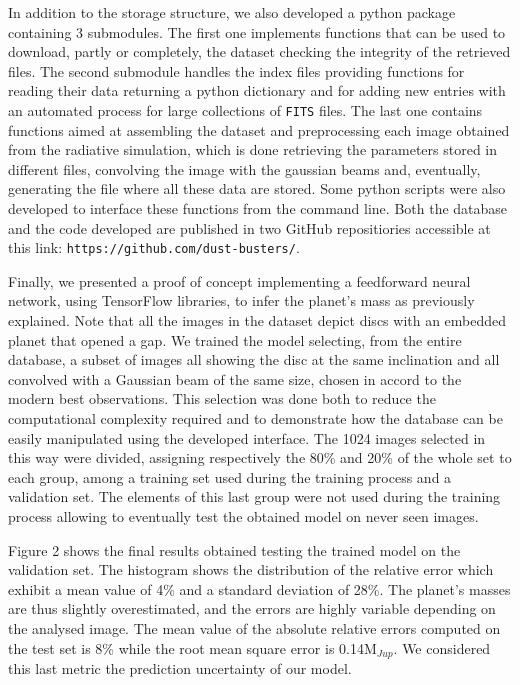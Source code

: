 \documentclass[a4paper,10pt, margin=1cm]{article}
\begin{document}
In addition to the storage structure, we also developed a python package containing 3 submodules. 
The first one implements functions that can be used to download, partly or completely, the dataset
checking the integrity of the retrieved files.
The second submodule handles the index files providing functions for reading their data
returning a python dictionary and for adding new entries 
with an automated process for large collections of \lstinline{FITS} files.
The last one contains functions aimed at assembling the dataset and
preprocessing each image obtained 
from the radiative simulation, which is done retrieving the parameters stored in different files,
convolving the image with the gaussian beams and, eventually, generating the file where all these data are stored.
Some python scripts were also developed to interface these functions from the command line.
Both the database and the code developed are published in two GitHub repositiories accessible at this link: \lstinline{https://github.com/dust-busters/}.

Finally, we presented a proof of concept implementing a feedforward
neural network, using TensorFlow libraries, to infer the planet's mass as previously explained.
Note that all the images in the dataset depict discs with an embedded planet that opened a gap.
We trained the model selecting, from the entire database,
a subset of images all showing the disc at the same inclination and all convolved with a Gaussian beam of the same size,
chosen in accord to the modern best observations. This selection was done both to reduce the
computational complexity required and to demonstrate how the database can be easily manipulated using the
developed interface. The 1024 images selected in this way were divided, assigning respectively the 80\% and 20\% of the whole set to each group,
among a training set used during the training process
and a validation set. The elements of this last group were not used during the training process allowing to eventually test the obtained model 
on never seen images. 

Figure 2 shows the final results obtained testing the trained model on the validation set. The histogram shows the
distribution of the relative error which exhibit a mean value of 4\% and a standard deviation of 28\%.
The planet's masses are thus slightly overestimated, and the errors are highly variable depending on the analysed image.
The mean value of the absolute relative errors computed on the test set is 8\% while the root mean square error is
0.14M$_{Jup}$. We considered this last metric the prediction uncertainty of our model.
\end{document}
